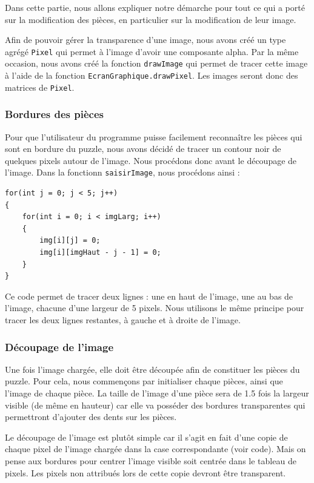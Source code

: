 \documentclass[]{article}
\newcommand{\variable}[1]{\noindent \texttt{#1}}
\begin{document}
Dans cette partie, nous allons expliquer notre démarche pour tout ce qui a porté sur la modification des pièces, en particulier sur la modification de leur image.

Afin de pouvoir gérer la transparence d'une image, nous avons créé un type agrégé \variable{Pixel} qui permet à l'image d'avoir une composante alpha. Par la même occasion, nous avons créé la fonction \variable{drawImage} qui permet de tracer cette image à l'aide de la fonction \variable{EcranGraphique.drawPixel}. Les images seront donc des matrices de \variable{Pixel}.

\subsubsection{Bordures des pièces}

Pour que l'utilisateur du programme puisse facilement reconnaître les pièces qui sont en bordure du puzzle, nous avons décidé de tracer un contour noir de quelques pixels autour de l'image. Nous procédons donc avant le découpage de l'image. Dans la fonctionn \variable{saisirImage}, nous procédons ainsi :

\begin{lstlisting}
for(int j = 0; j < 5; j++)
{
    for(int i = 0; i < imgLarg; i++)
    {
        img[i][j] = 0;
        img[i][imgHaut - j - 1] = 0;
    }
}
\end{lstlisting}

Ce code permet de tracer deux lignes : une en haut de l'image, une au bas de l'image, chacune d'une largeur de 5 pixels. Nous utilisons le même principe pour tracer les deux lignes restantes, à gauche et à droite de l'image.

\subsubsection{Découpage de l'image}

Une fois l'image chargée, elle doit être découpée afin de constituer les pièces du puzzle. Pour cela, nous commençons par initialiser chaque pièces, ainsi que l'image de chaque pièce. La taille de l'image d'une pièce sera de 1.5 fois la largeur visible (de même en hauteur) car elle va posséder des bordures transparentes qui permettront d'ajouter des dents sur les pièces.

Le découpage de l'image est plutôt simple car il s'agit en fait d'une copie de chaque pixel de l'image chargée dans la case correspondante (voir code). Mais on pense aux bordures pour centrer l'image visible soit centrée dans le tableau de pixels. Les pixels non attribués lors de cette copie devront être transparent.
\end{document}
